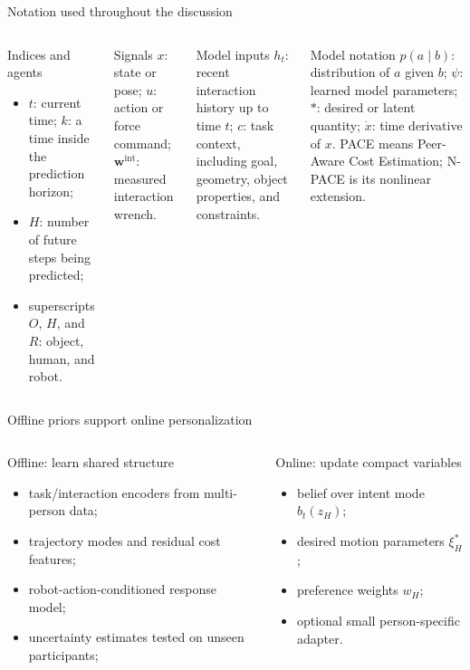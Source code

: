 \documentclass[aspectratio=169,11pt]{beamer}
\begin{document}
\begin{frame}{Notation used throughout the discussion}
\begin{columns}[T,onlytextwidth]
\begin{block}{Indices and agents}
\begin{itemize}
  \item $t$: current time; $k$: a time inside the prediction horizon;
  \item $H$: number of future steps being predicted;
  \item superscripts $O$, $H$, and $R$: object, human, and robot.
\end{itemize}
\end{block}
\begin{block}{Signals}
$x$: state or pose; $u$: action or force command; $\mathbf w^{\mathrm{int}}$: measured interaction wrench.
\end{block}
\begin{block}{Model inputs}
$h_t$: recent interaction history up to time $t$; $c$: task context, including goal, geometry, object properties, and constraints.
\end{block}
\begin{block}{Model notation}
$p(a\mid b)$: distribution of $a$ given $b$; $\psi$: learned model parameters; $*$: desired or latent quantity; $\dot{x}$: time derivative of $x$. PACE means Peer-Aware Cost Estimation; N-PACE is its nonlinear extension.
\end{block}
\end{columns}
\end{frame}


\begin{frame}{Offline priors support online personalization}
\begin{columns}[T,onlytextwidth]
\begin{block}{Offline: learn shared structure}
\begin{itemize}
  \item task/interaction encoders from multi-person data;
  \item trajectory modes and residual cost features;
  \item robot-action-conditioned response model;
  \item uncertainty estimates tested on unseen participants;
\end{itemize}
\end{block}
\begin{block}{Online: update compact variables}
\begin{itemize}
  \item belief over intent mode $b_t(z_H)$;
  \item desired motion parameters $\xi_H^*$;
  \item preference weights $w_H$;
  \item optional small person-specific adapter.
\end{itemize}
\end{block}
\end{columns}
\end{frame}
\end{document}
